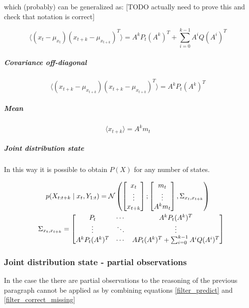 \documentclass{article}
\newcommand{\E}[1]{\langle #1 \rangle} %
\newcommand{\norm}[3]{\mathcal{N}\left(#1; #2, #3\right)} %
\begin{document}
which (probably) can be generalized as: [TODO actually need to prove this and check that notation is correct]

\begin{equation}
    \E{(x_t -\mu_{x_t})(x_{t+k} - \mu_{x_{t+k}})^T} = A^kP_t(A^k)^T + \sum_{i=0}^{k-1} A^iQ(A^i)^T
\end{equation}

\subparagraph{Covariance off-diagonal}

\begin{equation}
    \E{(x_{t+k} - \mu_{x_{t+k}})(x_{t+k} - \mu_{x_{t+k}})^T} = A^kP_t(A^k)^T
\end{equation}

\subparagraph{Mean}

\begin{equation}
    \E{x_{t+k}} = A^km_t
\end{equation}

\subparagraph{Joint distribution state}
In this way it is possible to obtain $P(X)$ for any number of states.

\begin{multline}\label{p_X_final}
p(X_{t:t+k}\mid x_t, Y_{1:t}) =\norm{\begin{bmatrix}x_t\\\vdots\\x_{t+k}\end{bmatrix}}{\begin{bmatrix}m_t\\\vdots\\A^km_t\end{bmatrix}}{\Sigma_{x_t, x_{t+k}}}\\
\shoveleft\Sigma_{x_t, x_{t+k}} = {\begin{bmatrix}P_t & \cdots & A^kP_t(A^k)^T\\ \vdots & \ddots & \vdots \\A^kP_t(A^k)^T & \cdots & AP_t(A^k)^T + \sum_{i=0}^{k-1} A^iQ(A^i)^T\end{bmatrix}}
\end{multline}



\subsubsection{Joint distribution state - partial observations}

In the case the there are partial observations to the reasoning of the previous paragraph cannot be applied as by combining equations \ref{filter_predict} and \ref{filter_correct_missing}
\end{document}
